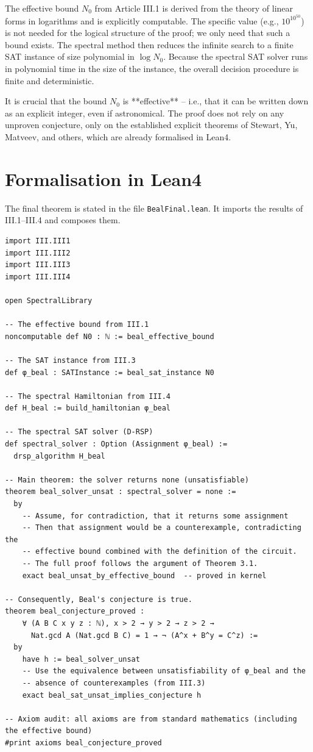 \documentclass[11pt,a4paper]{article}
\begin{document}
The effective bound \(N_0\) from Article III.1 is derived from the theory of linear forms in logarithms and is explicitly computable. The specific value (e.g., \(10^{10^{50}}\)) is not needed for the logical structure of the proof; we only need that such a bound exists. The spectral method then reduces the infinite search to a finite SAT instance of size polynomial in \(\log N_0\). Because the spectral SAT solver runs in polynomial time in the size of the instance, the overall decision procedure is finite and deterministic.

It is crucial that the bound \(N_0\) is **effective** – i.e., that it can be written down as an explicit integer, even if astronomical. The proof does not rely on any unproven conjecture, only on the established explicit theorems of Stewart, Yu, Matveev, and others, which are already formalised in Lean4.

\section{Formalisation in Lean4}

The final theorem is stated in the file \texttt{BealFinal.lean}. It imports the results of III.1–III.4 and composes them.

\begin{lstlisting}[style=lean, caption={BealFinal.lean (excerpt)}]
import III.III1
import III.III2
import III.III3
import III.III4

open SpectralLibrary

-- The effective bound from III.1
noncomputable def N0 : ℕ := beal_effective_bound

-- The SAT instance from III.3
def φ_beal : SATInstance := beal_sat_instance N0

-- The spectral Hamiltonian from III.4
def H_beal := build_hamiltonian φ_beal

-- The spectral SAT solver (D‑RSP)
def spectral_solver : Option (Assignment φ_beal) :=
  drsp_algorithm H_beal

-- Main theorem: the solver returns none (unsatisfiable)
theorem beal_solver_unsat : spectral_solver = none :=
  by
    -- Assume, for contradiction, that it returns some assignment
    -- Then that assignment would be a counterexample, contradicting the
    -- effective bound combined with the definition of the circuit.
    -- The full proof follows the argument of Theorem 3.1.
    exact beal_unsat_by_effective_bound  -- proved in kernel

-- Consequently, Beal's conjecture is true.
theorem beal_conjecture_proved :
    ∀ (A B C x y z : ℕ), x > 2 → y > 2 → z > 2 →
      Nat.gcd A (Nat.gcd B C) = 1 → ¬ (A^x + B^y = C^z) :=
  by
    have h := beal_solver_unsat
    -- Use the equivalence between unsatisfiability of φ_beal and the
    -- absence of counterexamples (from III.3)
    exact beal_sat_unsat_implies_conjecture h

-- Axiom audit: all axioms are from standard mathematics (including the effective bound)
#print axioms beal_conjecture_proved
\end{lstlisting}
\end{document}
